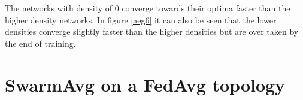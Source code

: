 The networks with density of 0 converge towards their optima faster than the higher density networks. In figure \ref{aeg6} it can also be seen that the lower densities converge slightly faster than the higher densities but are over taken by the end of training.

\section{SwarmAvg on a FedAvg topology}
